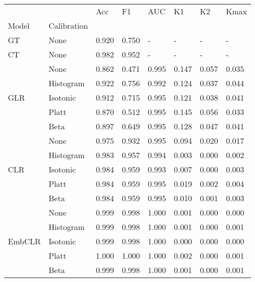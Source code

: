 \begin{tabular}{llllllll}
\toprule
 &  & Acc & F1 & AUC & K1 & K2 & Kmax \\
Model & Calibration &  &  &  &  &  &  \\
\midrule
GT & None & 0.920 & 0.750 & - & - & - & - \\
\cline{1-8}
CT & None & 0.982 & 0.952 & - & - & - & - \\
\cline{1-8}
\multirow[t]{5}{*}{GLR} & None & 0.862 & 0.471 & 0.995 & 0.147 & 0.057 & 0.035 \\
 & Histogram & 0.922 & 0.756 & 0.992 & 0.124 & 0.037 & 0.044 \\
 & Isotonic & 0.912 & 0.715 & 0.995 & 0.121 & 0.038 & 0.041 \\
 & Platt & 0.870 & 0.512 & 0.995 & 0.145 & 0.056 & 0.033 \\
 & Beta & 0.897 & 0.649 & 0.995 & 0.128 & 0.047 & 0.041 \\
\cline{1-8}
\multirow[t]{5}{*}{CLR} & None & 0.975 & 0.932 & 0.995 & 0.094 & 0.020 & 0.017 \\
 & Histogram & 0.983 & 0.957 & 0.994 & 0.003 & 0.000 & 0.002 \\
 & Isotonic & 0.984 & 0.959 & 0.993 & 0.007 & 0.000 & 0.003 \\
 & Platt & 0.984 & 0.959 & 0.995 & 0.019 & 0.002 & 0.004 \\
 & Beta & 0.984 & 0.959 & 0.995 & 0.010 & 0.001 & 0.003 \\
\cline{1-8}
\multirow[t]{5}{*}{EmbCLR} & None & 0.999 & 0.998 & 1.000 & 0.001 & 0.000 & 0.000 \\
 & Histogram & 0.999 & 0.998 & 1.000 & 0.001 & 0.000 & 0.001 \\
 & Isotonic & 0.999 & 0.998 & 1.000 & 0.000 & 0.000 & 0.000 \\
 & Platt & 1.000 & 1.000 & 1.000 & 0.002 & 0.000 & 0.001 \\
 & Beta & 0.999 & 0.998 & 1.000 & 0.001 & 0.000 & 0.001 \\
\cline{1-8}
\bottomrule
\end{tabular}
